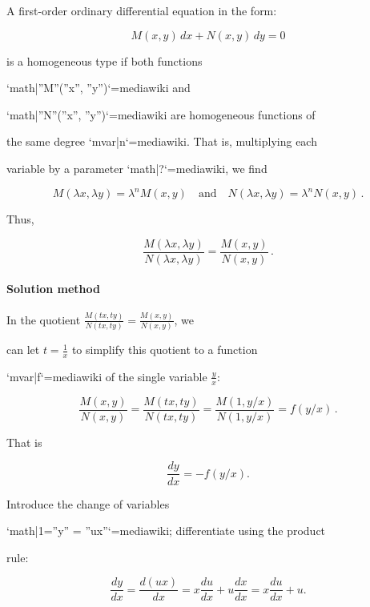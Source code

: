 A first-order ordinary differential equation in the form:



$$M(x,y)\,dx + N(x,y)\,dy = 0$$



is a homogeneous type if both functions

`{{math|''M''(''x'', ''y'')}}`{=mediawiki} and

`{{math|''N''(''x'', ''y'')}}`{=mediawiki} are homogeneous functions of

the same degree `{{mvar|n}}`{=mediawiki}. That is, multiplying each

variable by a parameter `{{math|?}}`{=mediawiki}, we find



$$M(\lambda x, \lambda y) = \lambda^n M(x,y) \quad \text{and} \quad N(\lambda x, \lambda y) = \lambda^n N(x,y)\,.$$



Thus,



$$\frac{M(\lambda x, \lambda y)}{N(\lambda x, \lambda y)} = \frac{M(x,y)}{N(x,y)}\,.$$



\paragraph{Solution method}



In the quotient $\frac{M(tx,ty)}{N(tx,ty)} = \frac{M(x,y)}{N(x,y)}$, we

can let $t = \frac{1}{x}$ to simplify this quotient to a function

`{{mvar|f}}`{=mediawiki} of the single variable $\frac{y}{x}$:



$$\frac{M(x,y)}{N(x,y)} = \frac{M(tx,ty)}{N(tx,ty)} = \frac{M(1,y/x)}{N(1,y/x)}=f(y/x)\,.$$

That is



$$\frac{dy}{dx} = -f(y/x).$$



Introduce the change of variables

`{{math|1=''y'' = ''ux''}}`{=mediawiki}; differentiate using the product

rule:



$$\frac{dy}{dx}=\frac{d(ux)}{dx} = x\frac{du}{dx} + u\frac{dx}{dx} = x\frac{du}{dx} + u.$$




